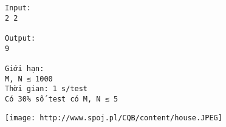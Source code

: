\begin{verbatim}
Input:
2 2

Output:
9

Giới hạn:
M, N ≤ 1000
Thời gian: 1 s/test
Có 30% số test có M, N ≤ 5 
\end{verbatim}


\texttt{[image: http://www.spoj.pl/CQB/content/house.JPEG]}